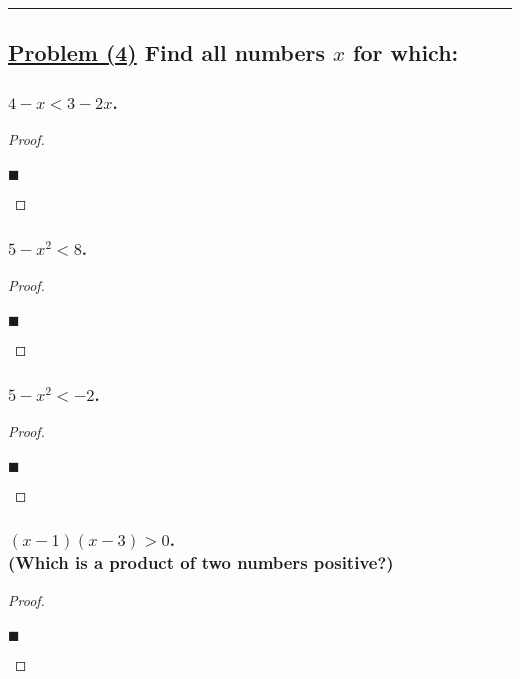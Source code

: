 \documentclass[letterpaper, 10 pt, conference]{ieeeconf}  %
\begin{document}
\noindent\rule{8cm}{0.4pt}

\subsection{\textbf{\underline{Problem (4)} Find all numbers $x$ for which: }}

\subsubsection{\textbf{$4 - x < 3 - 2x$.}}
\begin{proof}
\begin{align}
    
\end{align}
\begin{flushright}
$\blacksquare$
\end{flushright}
\end{proof}

\subsubsection{\textbf{$5 - x^2 < 8$.}}
\begin{proof}
\begin{align}
    
\end{align}
\begin{flushright}
$\blacksquare$
\end{flushright}
\end{proof}

\subsubsection{\textbf{$5 - x^2 < -2$.}}
\begin{proof}
\begin{align}
    
\end{align}
\begin{flushright}
$\blacksquare$
\end{flushright}
\end{proof}

\subsubsection{\textbf{$(x - 1)(x -3) > 0$. \\ (Which is a product of two numbers positive?)}}
\begin{proof}
\begin{align}
    
\end{align}
\begin{flushright}
$\blacksquare$
\end{flushright}
\end{proof}
\end{document}

